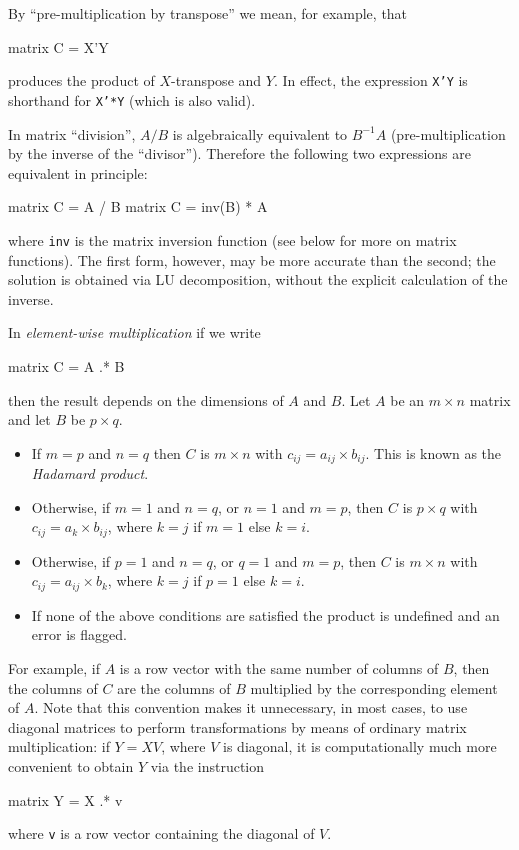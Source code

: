 By ``pre-multiplication by transpose'' we mean, for example, that 
%
\begin{code}
matrix C = X'Y
\end{code}
%
produces the product of $X$-transpose and $Y$.  In effect, 
the expression \texttt{X'Y} is shorthand for \texttt{X'*Y}
(which is also valid).

In matrix ``division'', $A/B$ is algebraically equivalent to
$B^{-1}A$ (pre-multiplication by the inverse of the ``divisor'').
Therefore the following two expressions are equivalent in principle:
%
\begin{code}
matrix C = A / B
matrix C = inv(B) * A
\end{code}
%
where \texttt{inv} is the matrix inversion function (see below for
more on matrix functions).  The first form, however, may be more
accurate than the second; the solution is obtained via LU
decomposition, without the explicit calculation of the inverse.

In \textit{element-wise multiplication} if we write
%
\begin{code}
matrix C = A .* B
\end{code}
% 
then the result depends on the dimensions of $A$ and $B$.  Let $A$ be
an $m \times n$ matrix and let $B$ be $p \times q$.  
%
\begin{itemize}
\item If $m=p$ and $n=q$ then $C$ is $m\times n$ with $c_{ij} = a_{ij}
  \times b_{ij}$.  This is known as the \emph{Hadamard product}.
\item Otherwise, if $m=1$ and $n=q$, or $n=1$ and $m=p$, then $C$ is
  $p\times q$ with $c_{ij} = a_k \times b_{ij}$, where $k=j$ if $m=1$
  else $k=i$.
\item Otherwise, if $p=1$ and $n=q$, or $q=1$ and $m=p$, then $C$ is
  $m\times n$ with $c_{ij} = a_{ij} \times b_k$, where $k=j$ if $p=1$
  else $k=i$.
\item If none of the above conditions are satisfied the product is
  undefined and an error is flagged.
\end{itemize}
For example, if $A$ is a row vector with the same number of
columns of $B$, then the columns of $C$ are the columns of $B$
multiplied by the corresponding element of $A$.  Note that this
convention makes it unnecessary, in most cases, to use diagonal
matrices to perform transformations by means of ordinary matrix
multiplication: if $Y = XV$, where $V$ is diagonal, it is
computationally much more convenient to obtain $Y$ via the
instruction
%
\begin{code}
matrix Y = X .* v
\end{code}
%
where \texttt{v} is a row vector containing the diagonal of $V$.

